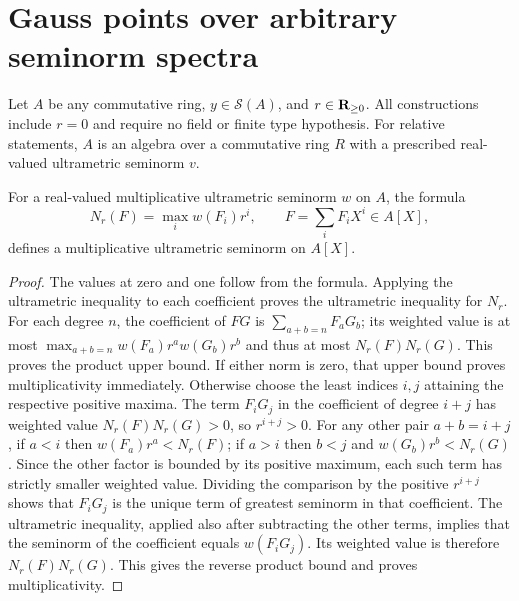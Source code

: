 \section{Gauss points over arbitrary seminorm spectra}\label{sec:general-gauss-points}

Let $A$ be any commutative ring, $y\in\mathcal S(A)$, and $r\in\mathbf{R}_{\ge0}$.
All constructions include $r=0$ and require no field or finite type hypothesis.
For relative statements, $A$ is an algebra over a commutative ring $R$ with
a prescribed real-valued ultrametric seminorm $v$.

\begin{lemma}\label{spectrum:gauss-valuation}
\leanok
{}
For a real-valued multiplicative ultrametric seminorm $w$ on $A$, the formula
\[
 N_r(F)=\max_i w(F_i)r^i,\qquad F=\sum_iF_iX^i\in A[X],
\]
defines a multiplicative ultrametric seminorm on $A[X]$.
\end{lemma}
\begin{proof}
The values at zero and one follow from the formula. Applying the ultrametric
inequality to each coefficient proves the ultrametric inequality for $N_r$.
For each degree $n$, the coefficient of $FG$ is $\sum_{a+b=n}F_aG_b$;
its weighted value is at most $\max_{a+b=n}w(F_a)r^a w(G_b)r^b$
and thus at most $N_r(F)N_r(G)$. This proves the product upper bound.
If either norm is zero, that upper bound proves multiplicativity immediately.
Otherwise choose the least indices $i,j$ attaining the respective positive maxima.
The term $F_iG_j$ in the coefficient of degree $i+j$ has weighted value
$N_r(F)N_r(G)>0$, so $r^{i+j}>0$.
For any other pair $a+b=i+j$, if $a<i$ then $w(F_a)r^a<N_r(F)$;
if $a>i$ then $b<j$ and $w(G_b)r^b<N_r(G)$.
Since the other factor is bounded by its positive maximum, each such term
has strictly smaller weighted value. Dividing the comparison by the positive
$r^{i+j}$ shows that $F_iG_j$ is the unique term of greatest seminorm in that
coefficient. The ultrametric inequality, applied also after subtracting the
other terms, implies that the seminorm of the coefficient equals
$w(F_iG_j)$. Its weighted value is therefore $N_r(F)N_r(G)$.
This gives the reverse product bound and proves multiplicativity.
\end{proof}

